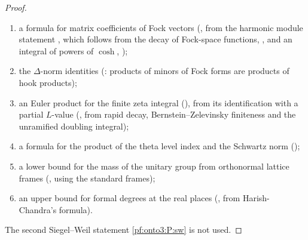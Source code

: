 \begin{proof}
\begin{enumerate}[label=(\arabic*)]
(, from rapid decay, the Weil--Siegel
formula, the parameter choice, and the continuation of Siegel Eisenstein series, which
 obtains from the doubling method);
\item a formula for matrix coefficients of Fock vectors
(, from the harmonic module statement
, which follows from the decay of Fock-space functions,
, and an integral of powers of $\cosh$,
);
\item the $\Delta$-norm identities (: products of minors of Fock
forms are products of hook products);
\item an Euler product for the finite zeta integral
(), from its identification with a partial
$L$-value (, from rapid decay,
Bernstein--Zelevinsky finiteness and the unramified doubling integral);
\item a formula for the product of the theta level index and the Schwartz norm
();
\item a lower bound for the mass of the unitary group from orthonormal lattice frames
(, using the standard frames);
\item an upper bound for formal degrees at the real places
(, from Harish-Chandra's formula).
\end{enumerate}
The second Siegel--Weil statement \ref{pf:onto3:P:sw} is not used.
\end{proof}

